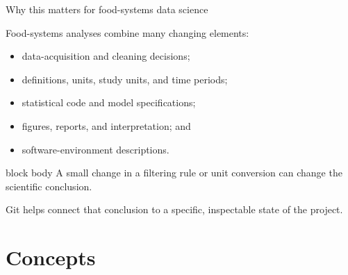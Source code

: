 \documentclass[10pt,aspectratio=169]{beamer}
\begin{document}
\begin{frame}{Why this matters for food-systems data science}

\small

Food-systems analyses combine many changing elements:

\begin{itemize}
  \item data-acquisition and cleaning decisions;
  \item definitions, units, study units, and time periods;
  \item statistical code and model specifications;
  \item figures, reports, and interpretation; and
  \item software-environment descriptions.
\end{itemize}

\vspace{0.25cm}

\begin{beamercolorbox}[rounded=true,sep=9pt]{block body}
A small change in a filtering rule or unit conversion can change the scientific
conclusion.

\vspace{0.1cm}

Git helps connect that conclusion to a specific, inspectable state of the
project.
\end{beamercolorbox}

\end{frame}


\section{Concepts}
\end{document}

